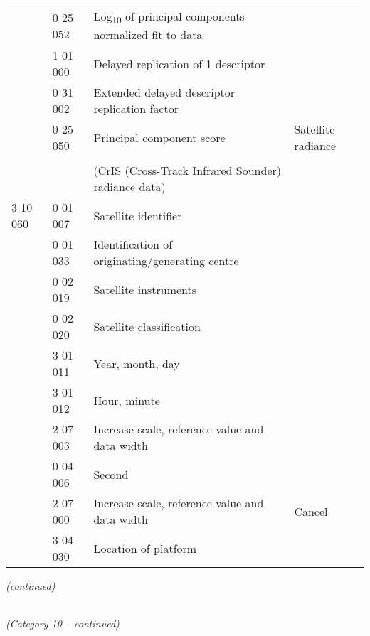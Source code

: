 \begin{longtable}[]{@{}llll@{}}
& 0 25 052 & Log\textsubscript{10} of principal components normalized fit to data &\tabularnewline
& 1 01 000 & Delayed replication of 1 descriptor &\tabularnewline
& 0 31 002 & Extended delayed descriptor replication factor &\tabularnewline
& 0 25 050 & Principal component score & Satellite radiance\tabularnewline
& & &\tabularnewline
& & (CrIS (Cross-Track Infrared Sounder) radiance data) &\tabularnewline
3 10 060 & 0 01 007 & Satellite identifier &\tabularnewline
& 0 01 033 & Identification of originating/generating centre &\tabularnewline
& 0 02 019 & Satellite instruments &\tabularnewline
& 0 02 020 & Satellite classification &\tabularnewline
& 3 01 011 & Year, month, day &\tabularnewline
& 3 01 012 & Hour, minute &\tabularnewline
& 2 07 003 & Increase scale, reference value and data width &\tabularnewline
& 0 04 006 & Second &\tabularnewline
& 2 07 000 & Increase scale, reference value and data width & Cancel\tabularnewline
& 3 04 030 & Location of platform &\tabularnewline
\bottomrule
\end{longtable}

\emph{(continued)}

\emph{\\
(Category 10 -- continued)}

